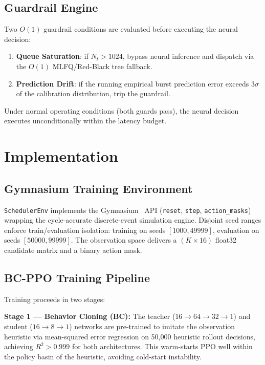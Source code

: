 \subsection{Guardrail Engine}
\label{subsec:guardrails}

Two $O(1)$ guardrail conditions are evaluated before executing the neural decision:

\begin{enumerate}
  \item \textbf{Queue Saturation}: if $N_t > 1024$, bypass neural inference and
    dispatch via the $O(1)$ MLFQ/Red-Black tree fallback.
  \item \textbf{Prediction Drift}: if the running empirical burst prediction
    error exceeds $3\sigma$ of the calibration distribution, trip the guardrail.
\end{enumerate}

Under normal operating conditions (both guards pass), the neural decision
executes unconditionally within the latency budget.

\section{Implementation}
\label{sec:impl}

\subsection{Gymnasium Training Environment}
\label{subsec:gym}

\texttt{SchedulerEnv} implements the Gymnasium~\cite{Gymnasium2023} API
(\texttt{reset}, \texttt{step}, \texttt{action\_masks}) wrapping the
cycle-accurate discrete-event simulation engine. Disjoint seed ranges enforce
train/evaluation isolation: training on seeds $[1000, 49999]$, evaluation on
seeds $[50000, 99999]$. The observation space delivers a
$(K \times 16)$ float32 candidate matrix and a binary action mask.

\subsection{BC-PPO Training Pipeline}
\label{subsec:training}

Training proceeds in two stages:

\textbf{Stage 1 --- Behavior Cloning (BC):} The teacher ($16\to 64\to 32\to 1$)
and student ($16\to 8\to 1$) networks are pre-trained to imitate the
observation heuristic via mean-squared error regression on 50{,}000 heuristic
rollout decisions, achieving $R^2 > 0.999$ for both architectures. This
warm-starts PPO well within the policy basin of the heuristic, avoiding cold-start
instability.

